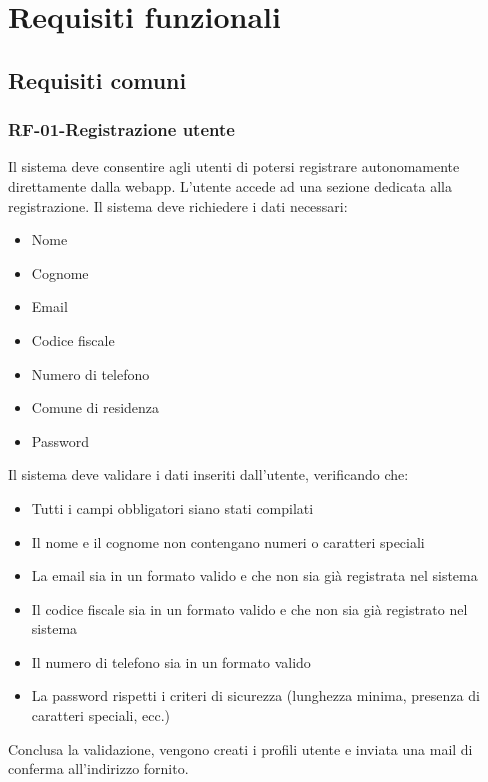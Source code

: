 \setcounter{section}{1}
\setlength{\parindent}{0pt}  %
\setlength{\parskip}{6pt}
\section{Requisiti funzionali}
\subsection{Requisiti comuni}
\subsubsection*{RF-01-Registrazione utente}
Il sistema deve consentire agli utenti di potersi registrare autonomamente direttamente dalla webapp. L'utente accede ad una sezione dedicata alla registrazione. Il sistema deve richiedere i dati necessari:
\begin{itemize}
    \item Nome
    \item Cognome
    \item Email
    \item Codice fiscale
    \item Numero di telefono
    \item Comune di residenza
    \item Password
\end{itemize}
Il sistema deve validare i dati inseriti dall'utente, verificando che:
\begin{itemize}
    \item Tutti i campi obbligatori siano stati compilati
    \item Il nome e il cognome non contengano numeri o caratteri speciali
    \item La email sia in un formato valido e che non sia già registrata nel sistema
    \item Il codice fiscale sia in un formato valido e che non sia già registrato nel sistema
    \item Il numero di telefono sia in un formato valido
    \item La password rispetti i criteri di sicurezza (lunghezza minima, presenza di caratteri speciali, ecc.)
\end{itemize}
Conclusa la validazione, vengono creati i profili utente e inviata una mail di conferma all'indirizzo fornito.
